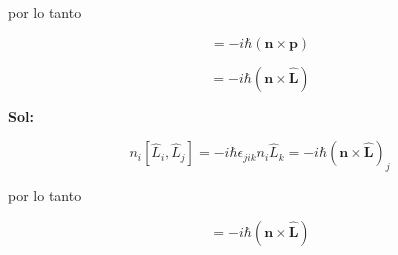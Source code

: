 \documentclass[12pt,a4paper]{article}
\begin{document}
\begin{enumerate}
por lo tanto

\begin{equation*}
    [\mathbf{n} \cdot \mathbf{L}, \mathbf{p}] = - i \hbar (\mathbf{n} \times \mathbf{p})
\end{equation*}

\begin{equation*}
    [\mathbf{n} \cdot \mathbf{\hat{L}}, \mathbf{\hat{L}}] = - i \hbar (\mathbf{n} \times \mathbf{\hat{L}})
\end{equation*}

\textbf{Sol:}

\begin{equation*}
    n_i[\hat{L}_i, \hat{L}_j] = - i \hbar \epsilon_{jik} n_i \hat{L}_k = - i \hbar (\mathbf{n} \times \mathbf{\hat{L}})_j
\end{equation*}

por lo tanto

\begin{equation*}
    [\mathbf{n} \cdot \mathbf{\hat{L}}, \mathbf{\hat{L}}] = - i \hbar (\mathbf{n} \times \mathbf{\hat{L}})
\end{equation*}





    
    
\end{enumerate}
\end{document}
